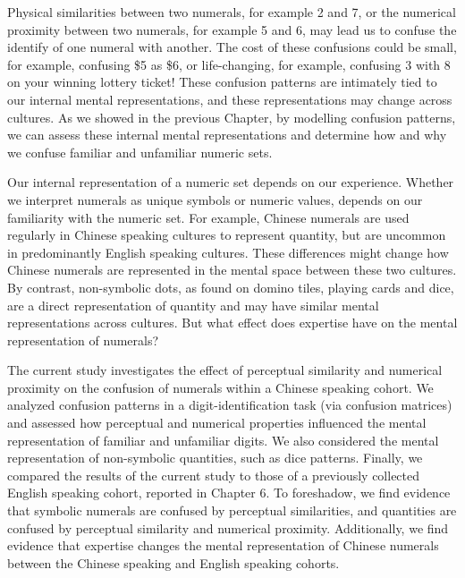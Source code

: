 Physical similarities between two numerals, for example 2 and 7, or the numerical proximity between two numerals, for example 5 and 6, may lead us to confuse the identify of one numeral with another. The cost of these confusions could be small, for example, confusing \$5 as \$6, or life-changing, for example, confusing 3 with 8 on your winning lottery ticket! These confusion patterns are intimately tied to our internal mental representations, and these representations may change across cultures. As we showed in the previous Chapter, by modelling confusion patterns, we can assess these internal mental representations and determine how and why we confuse familiar and unfamiliar numeric sets.

Our internal representation of a numeric set depends on %
our experience. Whether we interpret numerals as unique symbols or numeric values, depends on our familiarity with the numeric set. For example, Chinese numerals are used regularly in Chinese speaking cultures to represent quantity, but are uncommon in predominantly English speaking cultures. These differences might change how Chinese numerals are represented in the mental space between these two cultures. By contrast, non-symbolic dots, as found on domino tiles, playing cards and dice, are a direct representation of quantity and may have similar mental representations across cultures. But what effect does expertise have on the mental representation of numerals? 

The current study investigates the effect of perceptual similarity and numerical proximity on the confusion of numerals within a Chinese speaking cohort. We analyzed confusion patterns in a digit-identification task (via confusion matrices) and assessed how perceptual and numerical properties influenced the mental representation of familiar and unfamiliar digits. We also considered the mental representation of non-symbolic quantities, such as dice patterns. Finally, we compared the results of the current study to those of a previously collected English speaking cohort, reported in Chapter 6. To foreshadow, we find evidence that symbolic numerals are confused by perceptual similarities, and quantities are confused by perceptual similarity and numerical proximity. Additionally, we find evidence that expertise changes the mental representation of Chinese numerals between the Chinese speaking and English speaking cohorts. 
\color{black}

